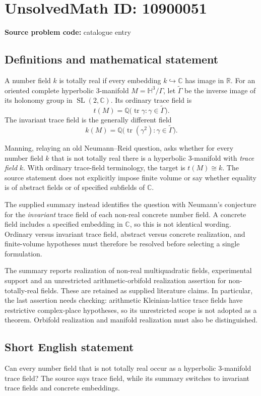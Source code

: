 \documentclass[11pt]{article}
\newcommand{\Q}{\mathbb{Q}}
\newcommand{\R}{\mathbb{R}}
\newcommand{\C}{\mathbb{C}}
\begin{document}
\section*{UnsolvedMath ID: 10900051}
\textbf{Source problem code:} catalogue entry
\subsection{Definitions and mathematical statement}
A number field \(k\) is totally real if every embedding \(k\hookrightarrow\C\) has image in \(\R\). For an oriented complete hyperbolic \(3\)-manifold \(M=\mathbb H^3/\Gamma\), let \(\widetilde\Gamma\) be the inverse image of its holonomy group in \(\operatorname{SL}(2,\C)\). Its ordinary trace field is
\[
 t(M)=\Q\bigl(\operatorname{tr}\gamma:\gamma\in\widetilde\Gamma\bigr).
\]
The invariant trace field is the generally different field
\[
 k(M)=\Q\bigl(\operatorname{tr}(\gamma^2):\gamma\in\widetilde\Gamma\bigr).
\]

Manning, relaying an old Neumann--Reid question, asks whether for every number field \(k\) that is not totally real there is a hyperbolic \(3\)-manifold with \emph{trace field} \(k\). With ordinary trace-field terminology, the target is \(t(M)\cong k\). The source statement does not explicitly impose finite volume or say whether equality is of abstract fields or of specified subfields of \(\C\).

The supplied summary instead identifies the question with Neumann's conjecture for the \emph{invariant} trace field of each non-real concrete number field. A concrete field includes a specified embedding in \(\C\), so this is not identical wording. Ordinary versus invariant trace field, abstract versus concrete realization, and finite-volume hypotheses must therefore be resolved before selecting a single formulation.

The summary reports realization of non-real multiquadratic fields, experimental support and an unrestricted arithmetic-orbifold realization assertion for non-totally-real fields. These are retained as supplied literature claims. In particular, the last assertion needs checking: arithmetic Kleinian-lattice trace fields have restrictive complex-place hypotheses, so its unrestricted scope is not adopted as a theorem. Orbifold realization and manifold realization must also be distinguished.
\subsection{Short English statement}
Can every number field that is not totally real occur as a hyperbolic \(3\)-manifold trace field? The source says trace field, while its summary switches to invariant trace fields and concrete embeddings.
\end{document}
